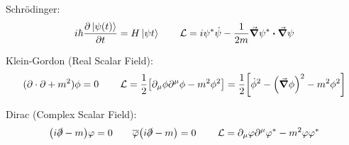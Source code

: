 Schrödinger:
\begin{equation*}
    i\hbar\pdv{\ket{\psi(t)}}{t} = H\ket{\psi{t}}
    \qquad
    \Lc = i\psi^*\dot{\psi} - \frac{1}{2m}\grad{\psi^*}\vdot\grad{\psi}
\end{equation*}

Klein-Gordon (Real Scalar Field):
\begin{equation*}
    (\partial\cdot\partial + m^2)\phi = 0
    \qquad
    \operatorname{\mathcal{L}} 
    = \frac{1}{2}\qty[\partial_\mu\phi\partial^\mu\phi - m^2\phi^2]
    = \frac{1}{2}\qty[\dot{\phi}^2 - \qty(\grad{\phi})^2 - m^2\phi^2]
\end{equation*}

Dirac (Complex Scalar Field):
\begin{equation*}
    \qty(i\slashed{\partial}-m)\varphi = 0
    \qquad
    \overline{\varphi}\qty(i\slashed{\partial}-m) = 0
    \qquad
    \operatorname{\mathcal{L}} 
    = \partial_\mu\varphi\partial^\mu\varphi^* - m^2\varphi\varphi^*
\end{equation*}